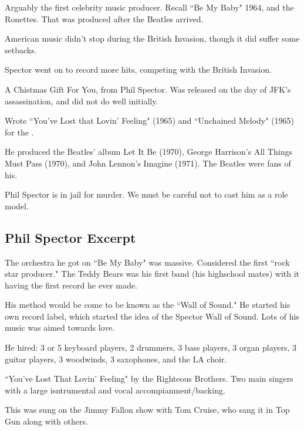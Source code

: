 \documentclass[12pt, a4paper, twoside, openright, titlepage]{book}
\begin{document}
Arguably the first celebrity music producer. Recall ``Be My Baby" 1964, and the Ronettes. That was produced after the Beatles arrived.

\begin{note}{}{}
    American music didn't stop during the British Invasion, though it did suffer some setbacks.
\end{note}

Spector went on to record more hits, competing with the British Invasion.

\begin{eg}{}{}
    A Chistmas Gift For You, from Phil Spector. Was released on the day of JFK's assassination, and did not do well initially.
\end{eg}


\begin{eg}{}{}
    Wrote ``You've Lost that Lovin' Feeling" (1965) and ``Unchained Melody" (1965) for the .
\end{eg}

He produced the Beatles' album Let It Be (1970), George Harrison's All Things Must Pass (1970), and John Lennon's Imagine (1971). The Beatles were fans of his.

\begin{note}{}{}
    Phil Spector is in jail for murder. We must be careful not to cast him as a role model.
\end{note}

\subsection{Phil Spector Excerpt}


The orchestra he got on ``Be My Baby" was massive. Considered the first ``rock star producer." The Teddy Bears was his first band (his highschool mates) with it having the first record he ever made.


His method would be come to be known as the ``Wall of Sound." He started his own record label, which started the idea of the Spector Wall of Sound. Lots of his music was aimed towards love.


He hired: 3 or 5 keyboard players, 2 drummers, 3 bass players, 3 organ players, 3 guitar players, 3 woodwinds, 3 saxophones, and the LA choir.


\begin{eg}{}{}
    ``You've Lost That Lovin' Feeling" by the Righteous Brothers. Two main singers with a large isntrumental and vocal accompianment/backing.

    This was sung on the Jimmy Fallon show with Tom Cruise, who sang it in Top Gun along with others.
\end{eg}
\end{document}
